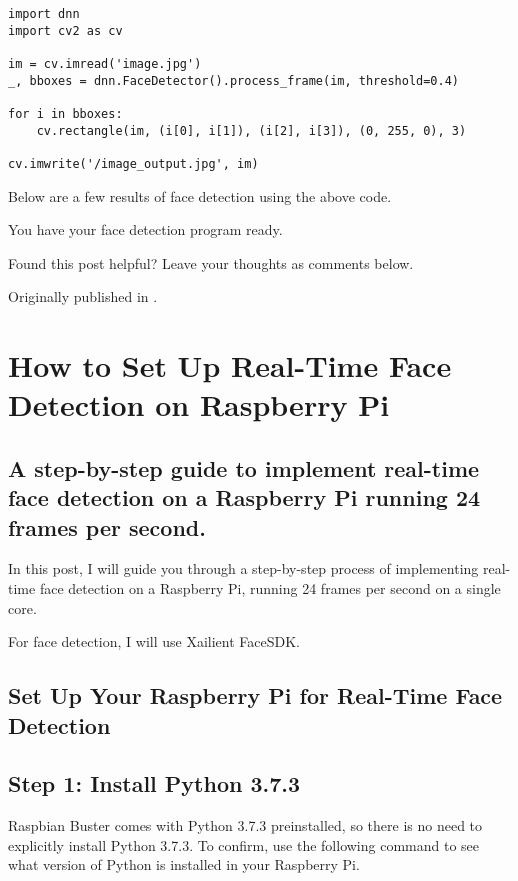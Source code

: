 \begin{lstlisting}
import dnn
import cv2 as cv

im = cv.imread('image.jpg')
_, bboxes = dnn.FaceDetector().process_frame(im, threshold=0.4) 

for i in bboxes:    
    cv.rectangle(im, (i[0], i[1]), (i[2], i[3]), (0, 255, 0), 3)

cv.imwrite('/image_output.jpg', im)
\end{lstlisting}


Below are a few results of face detection using the above code.


You have your face detection program ready.

Found this post helpful? Leave your thoughts as comments below.

Originally published in .

\section{How to Set Up Real-Time Face Detection on Raspberry Pi}

\subsection{A step-by-step guide to implement real-time face detection on a Raspberry Pi running 24 frames per second.}


In this post, I will guide you through a step-by-step process of implementing real-time face detection on a Raspberry Pi, running 24 frames per second on a single core.
    
For face detection, I will use Xailient FaceSDK.
    
\subsection{Set Up Your Raspberry Pi for Real-Time Face Detection}

\subsection{Step 1: Install Python 3.7.3}

Raspbian Buster comes with Python 3.7.3 preinstalled, so there is no need to explicitly install Python 3.7.3. To confirm, use the following command to see what version of Python is installed in your Raspberry Pi.

\medskip

